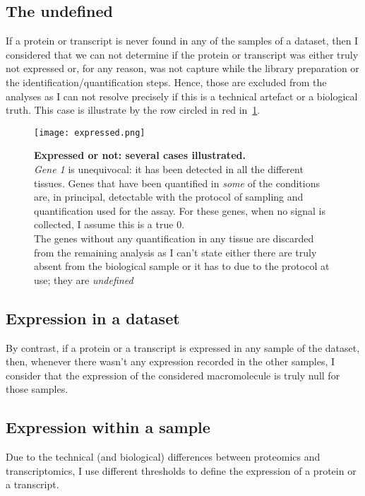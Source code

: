 \subsection{The undefined}
\label{subsec:IntegrationExpressedOrNot-undefined}
If a protein or transcript is never found in any of the samples of a dataset,
then I considered that we can not determine if the protein or transcript was
either truly not expressed or, for any reason, was not capture while the library
preparation or the identification/quantification steps. Hence, those are
excluded from the analyses as I can not resolve precisely if this is a
technical artefact or a biological truth. This case is illustrate by the row
circled in red in~\cref{fig:DefineExpression}.

\begin{figure}%
\texttt{[image: expressed.png]}\centering
    \caption[Expressed or not: several cases illustrated]
    {\label{fig:DefineExpression}\textbf{Expressed or not: several cases
    illustrated.} \\\emph{Gene 1} is unequivocal: it has been detected in all the
    different tissues. Genes that have been quantified in \emph{some} of the
    conditions are, in principal, detectable with the protocol of sampling and
    quantification used for the assay. For these genes, when no signal is
    collected, I assume this is a true $0$.\\The genes without any quantification
    in any tissue are discarded from the remaining analysis as I can't state
    either there are truly absent from the biological sample or it has to due
    to the protocol at use; they are \emph{undefined}}
\end{figure}

\subsection{Expression in a dataset}
\label{subsec:IntegrationExpressedOrNot--expDataset}
By contrast, if a protein or a transcript is expressed in any sample of the
dataset, then, whenever there wasn't any expression recorded in the other
samples, I consider that the expression of the considered macromolecule is truly
null for those samples.

\subsection{Expression within a sample}
Due to the technical (and biological) differences between proteomics and
transcriptomics, I use different thresholds to define the expression of a protein
or a transcript.


